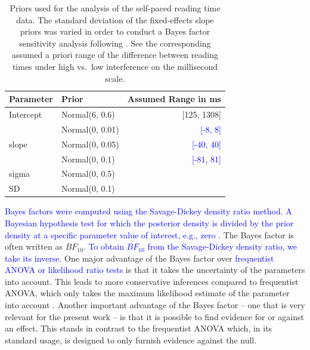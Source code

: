 \documentclass[a4paper, man, floatsintext]{apa7}
\begin{document}
\begin{table}[h]
    \caption{Priors used for the analysis of the self-paced reading time data. The standard deviation of the fixed-effects slope priors was varied in order to conduct a Bayes factor sensitivity analysis following \citet{schad_etal_2022_BF}. See the corresponding assumed a priori range of the difference between reading times under high vs.\ low interference on the millisecond scale.}
    \label{tab:spr_priors}
    \centering
     \begin{tabular}{llr}
    \toprule
    Parameter&Prior &Assumed Range in ms\\
    \midrule
  Intercept & Normal(6, 0.6)& [125, 1308]\\
  \cmidrule{2-3}
  \multirow{3}{1cm}{slope} & Normal(0, 0.01) & \textcolor{blue}{[-8, 8]}\\
  &  Normal(0, 0.05)&  \textcolor{blue}{[-40, 40]}\\
  & Normal(0, 0.1) & \textcolor{blue}{[-81, 81]}\\
  \cmidrule{2-3}
  sigma & Normal(0, 0.5)&\\
  SD & Normal(0, 0.1) &\\
  \bottomrule
  \end{tabular}
  \end{table}

\textcolor{blue}{Bayes factors were computed using the Savage-Dickey density ratio method. A Bayesian hypothesis test for which the posterior density is divided by the prior density at a specific parameter value of interest, e.g., zero \citep{wagenmakers_savagedickey, vuorre2017_savagedickey, dickey1970}.} The Bayes factor is often written as $BF_{10}$. \textcolor{blue}{To obtain $BF_{10}$ from the Savage-Dickey density ratio, we take its inverse.} One major advantage of the Bayes factor over \textcolor{blue}{frequentist ANOVA or likelihood ratio tests} is that it takes the uncertainty of the parameters into account. This leads to more conservative inferences compared to frequentist ANOVA, which only takes the maximum likelihood estimate of the parameter into account \parencite[see][for detailed discussion]{schad_etal_2022_BF}. Another important advantage of the Bayes factor -- one that is very relevant for the present work -- is that it is possible to find evidence for or against an effect. This stands in contrast to the frequentist ANOVA which, in its standard usage, is designed to only furnish evidence against the null. 
\end{document}

